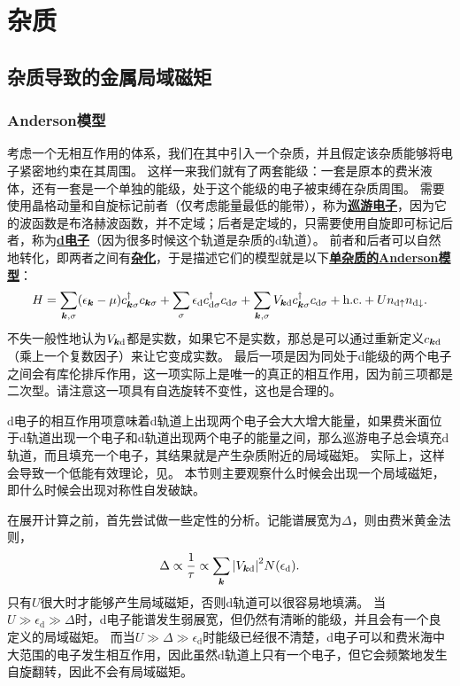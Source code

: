 \documentclass[hyperref, UTF8, a4paper]{ctexart}
\renewcommand{\autoref}{\prettyref}
\newcommand*{\concept}[1]{\underline{\textbf{#1}}}
\begin{document}
\section{杂质}

\subsection{杂质导致的金属局域磁矩}

\subsubsection{Anderson模型}\label{sec:anderson-model}

考虑一个无相互作用的体系，我们在其中引入一个杂质，并且假定该杂质能够将电子紧密地约束在其周围。
这样一来我们就有了两套能级：一套是原本的费米液体，还有一套是一个单独的能级，处于这个能级的电子被束缚在杂质周围。
需要使用晶格动量和自旋标记前者（仅考虑能量最低的能带），称为\concept{巡游电子}，因为它的波函数是布洛赫波函数，并不定域；后者是定域的，只需要使用自旋即可标记后者，称为\concept{d电子}（因为很多时候这个轨道是杂质的d轨道）。
前者和后者可以自然地转化，即两者之间有\concept{杂化}，于是描述它们的模型就是以下\concept{单杂质的Anderson模型}：
\begin{equation}
    {H} = \sum_{\vb*{k}, \sigma} (\epsilon_{\vb*{k}} - \mu) {c}_{\vb*{k}\sigma}^\dagger {c}_{\vb*{k} \sigma} + \sum_\sigma \epsilon_\text{d} {c}_{\text{d}\sigma}^\dagger {c}_{\text{d} \sigma} + \sum_{\vb*{k}, \sigma} V_{\vb*{k} \text{d}} {c}_{\vb*{k} \sigma}^\dagger {c}_{\text{d} \sigma} + \text{h.c.} + U {n}_{\text{d} \uparrow} {n}_{\text{d} \downarrow}.
    \label{eq:impurity-anderson}
\end{equation}
不失一般性地认为$V_{\vb*{k} \text{d}}$都是实数，如果它不是实数，那总是可以通过重新定义${c}_{\vb*{k} \text{d}}$（乘上一个复数因子）来让它变成实数。
最后一项是因为同处于d能级的两个电子之间会有库伦排斥作用，这一项实际上是唯一的真正的相互作用，因为前三项都是二次型。请注意这一项具有自选旋转不变性，这也是合理的。

d电子的相互作用项意味着d轨道上出现两个电子会大大增大能量，如果费米面位于d轨道出现一个电子和d轨道出现两个电子的能量之间，那么巡游电子总会填充d轨道，而且填充一个电子，其结果就是产生杂质附近的局域磁矩。
实际上，这样会导致一个低能有效理论，见\autoref{sec:kondo-effect}。
本节则主要观察什么时候会出现一个局域磁矩，即什么时候会出现对称性自发破缺。

在展开计算之前，首先尝试做一些定性的分析。记能谱展宽为$\Delta$，则由费米黄金法则，
\[
    \Delta \propto \frac{1}{\tau} \propto \sum_{\vb*{k}} \abs{V_{\vb*{k} \text{d}}}^2 N(\epsilon_\text{d}).
\]
只有$U$很大时才能够产生局域磁矩，否则d轨道可以很容易地填满。
当$U \gg \epsilon_\text{d} \gg \Delta$时，d电子能谱发生弱展宽，但仍然有清晰的能级，并且会有一个良定义的局域磁矩。
而当$U \gg \Delta \gg \epsilon_\text{d}$时能级已经很不清楚，d电子可以和费米海中大范围的电子发生相互作用，因此虽然d轨道上只有一个电子，但它会频繁地发生自旋翻转，因此不会有局域磁矩。
\end{document}
